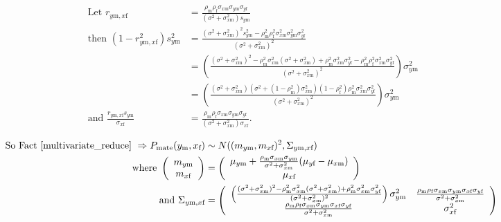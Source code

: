 \documentclass{article}
\newcommand{\x}[1]{\text{#1}}
\begin{document}
\begin{pf}
\begin{enumerate}
\begin{align*}
\\ \text{ Let } r_{y\x{m},x\x{f}}&=\frac{\rho_\x{m}\rho_\x{f}\sigma_{x\x{m}}\sigma_{y\x{m}}\sigma_{y\x{f}}}{(\sigma^2+\sigma_{x\x{m}}^2)s_{y\x{m}}}
\\ \text{ then } (1-r_{y\x{m},x\x{f}}^2)s_{y\x{m}}^2&=\frac{(\sigma^2+\sigma_{x\x{m}}^2)^2s_{y\x{m}}^2-\rho_\x{m}^2\rho_\x{f}^2\sigma_{x\x{m}}^2\sigma_{y\x{m}}^2\sigma_{y\x{f}}^2}{(\sigma^2+\sigma_{x\x{m}}^2)^2}
\\&=\left(\frac{(\sigma^2+\sigma_{x\x{m}}^2)^2-\rho_\x{m}^2\sigma_{x\x{m}}^2(\sigma^2+\sigma_{x\x{m}}^2)+\rho_\x{m}^2\sigma_{x\x{m}}^2\sigma_{y\x{f}}^2-\rho_\x{m}^2\rho_\x{f}^2\sigma_{x\x{m}}^2\sigma_{y\x{f}}^2}{(\sigma^2+\sigma_{x\x{m}}^2)^2}\right)\sigma_{y\x{m}}^2
\\&=\left(\frac{(\sigma^2+\sigma_{x\x{m}}^2)(\sigma^2+(1-\rho_\x{m}^2)\sigma_{x\x{m}}^2)(1-\rho_\x{f}^2)\rho_\x{m}^2\sigma_{x\x{m}}^2\sigma_{y\x{f}}^2}{(\sigma^2+\sigma_{x\x{m}}^2)^2}\right)\sigma_{y\x{m}}^2
\\ \text { and } \frac{r_{y\x{m},x\x{f}}s_{y\x{m}}}{\sigma_{x\x{f}}}&=\frac{\rho_\x{m}\rho_\x{f}\sigma_{x\x{m}}\sigma_{y\x{m}}\sigma_{y\x{f}}}{(\sigma^2+\sigma_{x\x{m}}^2)\sigma_{x\x{f}}}.
\end{align*}

\begin{align*}
\text{So Fact \ref{multivariate_reduce} } \Rightarrow P_\text{mate}(y_\x{m},x_\x{f})&\sim N((m_{y\x{m}},m_{x\x{f}})^2,\Sigma_{y\x{m},x\x{f}}) 
\\ \text{ where } \left(\begin{array}{c}m_{y\x{m}} \\  m_{x\x{f}} \end{array}\right)&=\left(\begin{array}{c}\mu_{y\x{m}}+\frac{\rho_\x{m}\sigma_{x\x{m}}\sigma_{y\x{m}}}{\sigma^2+\sigma_{x\x{m}}^2}(\mu_{y\x{f}}-\mu_{x\x{m}}) \\ \mu_{x\x{f}} \end{array}\right)
\\ \text{ and } \Sigma_{y\x{m},x\x{f}}&=\left(\begin{array}{cc}\left(\frac{(\sigma^2+\sigma_{x\x{m}}^2)^2-\rho_\x{m}^2\sigma_{x\x{m}}^2(\sigma^2+\sigma_{x\x{m}}^2)+\rho_\x{m}^2\sigma_{x\x{m}}^2\sigma_{y\x{f}}^2}{(\sigma^2+\sigma_{x\x{m}}^2)^2}\right)\sigma_{y\x{m}}^2 & \frac{\rho_\x{m}\rho_\x{f}\sigma_{x\x{m}}\sigma_{y\x{m}}\sigma_{x\x{f}}\sigma_{y\x{f}}}{\sigma^2+\sigma_{x\x{m}}^2} \\ \frac{\rho_\x{m}\rho_\x{f}\sigma_{x\x{m}}\sigma_{y\x{m}}\sigma_{x\x{f}}\sigma_{y\x{f}}}{\sigma^2+\sigma_{x\x{m}}^2}& \sigma_{x\x{f}}^2 \end{array}\right)
\end{align*}


\end{enumerate}
\end{pf}
\end{document}
